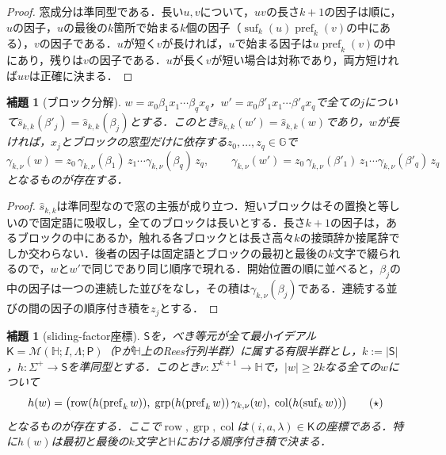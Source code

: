 \documentclass[11pt,a4paper]{ltjsarticle}
\numberwithin{equation}{section}
\theoremstyle{plain}
\newtheorem{lemma}[theorem]{補題}
\theoremstyle{definition}
\theoremstyle{remark}
\begin{document}
\begin{proof}
窓成分は準同型である．長い$u,v$について，$uv$の長さ$k+1$の因子は順に，$u$の因子，$u$の最後の$k$箇所で始まる$k$個の因子（$\operatorname{suf}_k(u)\operatorname{pref}_k(v)$の中にある），$v$の因子である．$u$が短く$v$が長ければ，$u$で始まる因子は$u\operatorname{pref}_k(v)$の中にあり，残りは$v$の因子である．$u$が長く$v$が短い場合は対称であり，両方短ければ$uv$は正確に決まる．
\end{proof}

\begin{lemma}[ブロック分解]
\label{lem:local-group-blocks}
$w=x_0\beta_1x_1\cdots\beta_qx_q$，$w'=x_0\beta'_1x_1\cdots\beta'_qx_q$で全ての$j$について$\widehat s_{k,k}(\beta'_j)=\widehat s_{k,k}(\beta_j)$とする．このとき$\widehat s_{k,k}(w')=\widehat s_{k,k}(w)$であり，$w$が長ければ，$x_j$とブロックの窓型だけに依存する$z_0,\ldots,z_q\in {\mathbb G}$で
\[
 \gamma_{k,\nu}(w)=z_0\,\gamma_{k,\nu}(\beta_1)\,z_1\cdots\gamma_{k,\nu}(\beta_q)\,z_q,
 \qquad
 \gamma_{k,\nu}(w')=z_0\,\gamma_{k,\nu}(\beta'_1)\,z_1\cdots\gamma_{k,\nu}(\beta'_q)\,z_q
\]
となるものが存在する．
\end{lemma}

\begin{proof}
$\widehat s_{k,k}$は準同型なので窓の主張が成り立つ．短いブロックはその置換と等しいので固定語に吸収し，全てのブロックは長いとする．長さ$k+1$の因子は，あるブロックの中にあるか，触れる各ブロックとは長さ高々$k$の接頭辞か接尾辞でしか交わらない．後者の因子は固定語とブロックの最初と最後の$k$文字で綴られるので，$w$と$w'$で同じであり同じ順序で現れる．開始位置の順に並べると，$\beta_j$の中の因子は一つの連続した並びをなし，その積は$\gamma_{k,\nu}(\beta_j)$である．連続する並びの間の因子の順序付き積を$z_j$とする．
\end{proof}

\begin{lemma}[sliding-factor座標]
\label{lem:lg-rees-window-coordinate}
$\mathsf S$を，べき等元が全て最小イデアル$\mathsf K=\mathcal M({\mathbb H};I,\Lambda;\mathsf P)$（$\mathsf P$が${\mathbb H}$上のRees行列半群）に属する有限半群とし，$k:=|\mathsf S|$，$h:\Sigma^+\to \mathsf S$を準同型とする．このとき$\nu:\Sigma^{k+1}\to {\mathbb H}$で，$|w|\ge2k$なる全ての$w$について
\[
 h(w)=\bigl(\operatorname{row}(h(\operatorname{pref}_kw)),\;
 \operatorname{grp}(h(\operatorname{pref}_kw))\,\gamma_{k,\nu}(w),\;
 \operatorname{col}(h(\operatorname{suf}_kw))\bigr)
 \tag{\ensuremath{\star}}
\]
となるものが存在する．ここで$\operatorname{row},\operatorname{grp},\operatorname{col}$は$(i,a,\lambda)\in\mathsf K$の座標である．特に$h(w)$は最初と最後の$k$文字と${\mathbb H}$における順序付き積で決まる．
\end{lemma}
\end{document}
